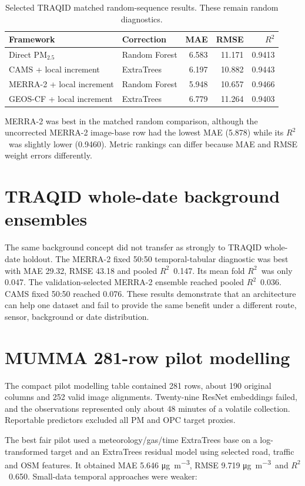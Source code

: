 \documentclass[11pt,a4paper,oneside]{report}
\newcommand{\pmtwo}{PM$_{2.5}$}
\newcommand{\ugm}{\si{\micro\gram\per\cubic\metre}}
\newcommand{\Rtwo}{$R^2$}
\begin{document}
\begin{table}[H]
  \centering
  \caption{Selected TRAQID matched random-sequence results. These remain random
  diagnostics.}
  \label{tab:traqidmatchedrandom}
  \begin{tabular}{llrrr}
    \toprule
    Framework & Correction & MAE & RMSE & \Rtwo\\
    \midrule
    Direct \pmtwo & Random Forest & 6.583 & 11.171 & 0.9413\\
    CAMS + local increment & ExtraTrees & 6.197 & 10.882 & 0.9443\\
    MERRA-2 + local increment & Random Forest & 5.948 & 10.657 & 0.9466\\
    GEOS-CF + local increment & ExtraTrees & 6.779 & 11.264 & 0.9403\\
    \bottomrule
  \end{tabular}
\end{table}

MERRA-2 was best in the matched random comparison, although the uncorrected
MERRA-2 image-base row had the lowest MAE (5.878) while its \Rtwo\ was slightly
lower (0.9460). Metric rankings can differ because MAE and RMSE weight errors
differently.

\section{TRAQID whole-date background ensembles}
The same background concept did not transfer as strongly to TRAQID whole-date
holdout. The MERRA-2 fixed 50:50 temporal-tabular diagnostic was best with MAE
29.32, RMSE 43.18 and pooled \Rtwo\ 0.147. Its mean fold \Rtwo\ was only 0.047.
The validation-selected MERRA-2 ensemble reached pooled \Rtwo\ 0.036. CAMS
fixed 50:50 reached 0.076. These results demonstrate that an architecture can
help one dataset and fail to provide the same benefit under a different route,
sensor, background or date distribution.

\section{MUMMA 281-row pilot modelling}
The compact pilot modelling table contained 281 rows, about 190 original
columns and 252 valid image alignments. Twenty-nine ResNet embeddings failed,
and the observations represented only about 48 minutes of a volatile
collection. Reportable predictors excluded all PM and OPC target proxies.

The best fair pilot used a meteorology/gas/time ExtraTrees base on a
log-transformed target and an ExtraTrees residual model using selected road,
traffic and OSM features. It obtained MAE 5.646 \ugm, RMSE 9.719 \ugm\ and
\Rtwo\ 0.650. Small-data temporal approaches were weaker:
\end{document}
